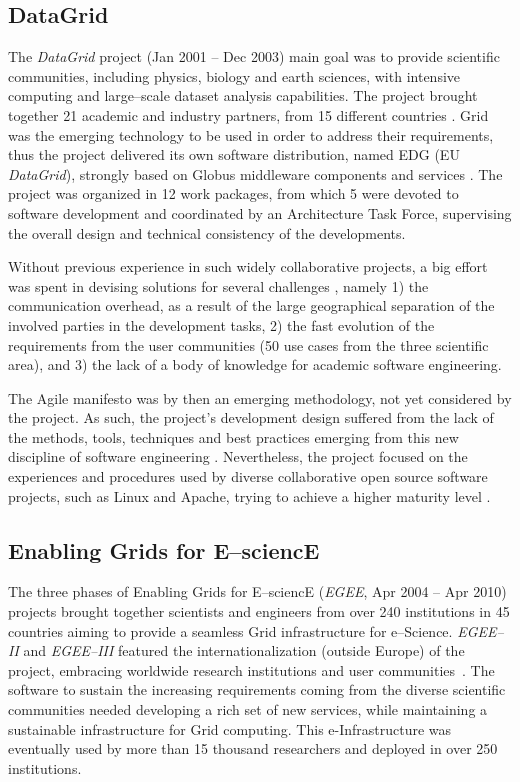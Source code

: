 \documentclass[journal]{IEEEtran}
\begin{document}
\subsection{DataGrid}

The {\sl DataGrid} \cite{cordis:datagrid} project (Jan 2001 -- Dec 2003)
main goal was to provide scientific communities, including physics, biology and
earth sciences, with intensive computing and large--scale dataset analysis capabilities.
The project brought together 21 academic and industry partners, from 15 different countries \cite{gagliardi}.
Grid was the emerging technology to be used in order to address their requirements,
thus the project delivered its own software distribution, named EDG (EU {\sl DataGrid}), strongly
based on Globus middleware components and services \cite{globus}. The project was organized in 12 work packages, from
which 5 were devoted to software development and coordinated by an
Architecture Task Force, supervising the overall design and technical consistency
of the developments.

Without previous experience in such widely
collaborative projects, a big effort was spent in devising solutions for several
challenges \cite{datagrid}, namely 1) the communication overhead, as a
result of the large geographical separation of the involved parties in the
development tasks, 2) the fast evolution of the requirements from the user
communities (50 use cases from the three scientific area), and 3) the lack of a body
of knowledge for academic software engineering.

The Agile manifesto \cite{agile-manifesto} was by then an emerging methodology, not yet
considered by the project. As such, the project's
development design suffered from the lack of the methods, tools, techniques and best
practices emerging from this new discipline of software engineering
\cite{agile}. Nevertheless, the project focused on the experiences and procedures
used by diverse collaborative open source software projects, such as Linux and Apache, trying to
achieve a higher maturity level \cite{cmm}.

\subsection{Enabling Grids for E--sciencE}

The three phases of Enabling Grids for E--sciencE ({\sl EGEE}, Apr 2004 -- Apr 2010)
\cite{cordis:egee,cordis:egee2,cordis:egee3} projects brought together
scientists and engineers from over 240 institutions in 45 countries aiming to
provide a seamless Grid infrastructure for e--Science. {\sl EGEE--II} and {\sl EGEE--III}
featured the internationalization (outside Europe) of the project, embracing worldwide research
institutions and user communities~\cite{egee}. The software to sustain the increasing
requirements coming from the diverse scientific communities needed developing a
rich set of new services, while maintaining a sustainable infrastructure for
Grid computing. This e-Infrastructure was eventually used by more than 15 thousand researchers
and deployed in over 250 institutions.
\end{document}
